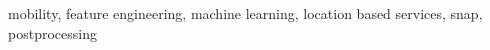 \begin{IEEEkeywords}
mobility, feature engineering, machine learning, location based services, snap, postprocessing
\end{IEEEkeywords}